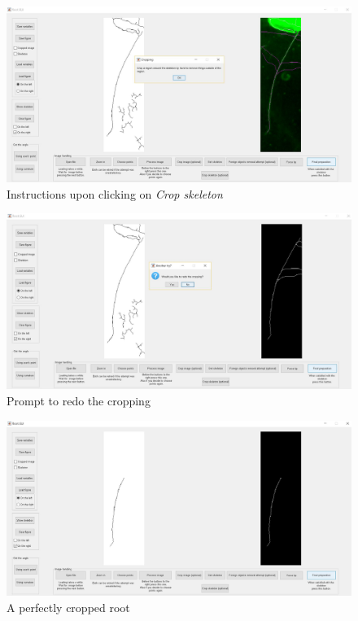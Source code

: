 \begin{figure}[H]
	\centering
	\includegraphics[width=\textwidth]{../Figures/manual/optionalD2.jpg}
	\caption{Instructions upon clicking on \textit{Crop skeleton}}
	\label{fig:img56}
\end{figure}

\begin{figure}[H]
	\centering
	\includegraphics[width=\textwidth]{../Figures/manual/optionalD3.jpg}
	\caption{Prompt to redo the cropping}
	\label{fig:img57}
\end{figure}

\begin{figure}[H]
	\centering
	\includegraphics[width=\textwidth]{../Figures/manual/optionalD4.jpg}
	\caption{A perfectly cropped root}
	\label{fig:img58}
\end{figure}

